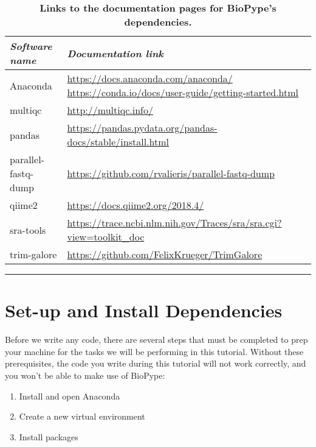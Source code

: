 \begin{table}[hbtp]
\begin{maxipage}
\caption{\textbf{Links to the documentation pages for BioPype's dependencies.}}
\begin{tabular}{ l | p{12.25cm} }
\textit{Software name} & \textit{Documentation link} \\
\hline
Anaconda & \url{https://docs.anaconda.com/anaconda/} \newline \url{https://conda.io/docs/user-guide/getting-started.html} \\
multiqc & \url{http://multiqc.info/} \\
pandas & \url{https://pandas.pydata.org/pandas-docs/stable/install.html} \\
parallel-fastq-dump & \url{https://github.com/rvalieris/parallel-fastq-dump} \\
qiime2 & \url{https://docs.qiime2.org/2018.4/} \\
sra-tools & \url{https://trace.ncbi.nlm.nih.gov/Traces/sra/sra.cgi?view=toolkit_doc} \\
trim-galore &  \url{https://github.com/FelixKrueger/TrimGalore} \\
\end{tabular}
\label{tab:software-doc-links}
\hrule
\end{maxipage}
\end{table}%



%
\section{Set-up and Install Dependencies}
Before we write any code, there are several steps that must be completed to prep your machine for the tasks we will be performing in this tutorial. Without these prerequisites, the code you write during this tutorial will not work correctly, and you won't be able to make use of BioPype:
\begin{enumerate}
\item Install and open Anaconda
\item Create a new virtual environment
\item Install packages
\end{enumerate}

